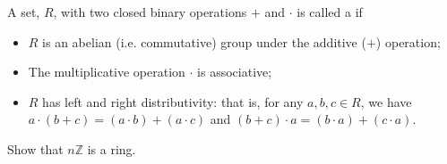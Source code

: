 \begin{defn} \label{def:ring}
A set, $R$, with two closed binary operations $+$ and $\cdot$  is called a  if 
\begin{itemize}
\item
$R$ is an abelian (i.e. commutative) group under the additive ($+$) operation;
\item
The multiplicative operation $\cdot$ is associative;
\item 
$R$ has left and right distributivity: that is, for any $a,b,c \in R$, we have $a \cdot (b + c) = (a \cdot b) + (a \cdot c)$ and $(b + c) \cdot a = (b \cdot a) + (c \cdot a)$.
\end{itemize}
\end{defn}

\begin{exercise}{}
Show that $n\mathbb{Z}$ is a ring.
\end{exercise}{}

